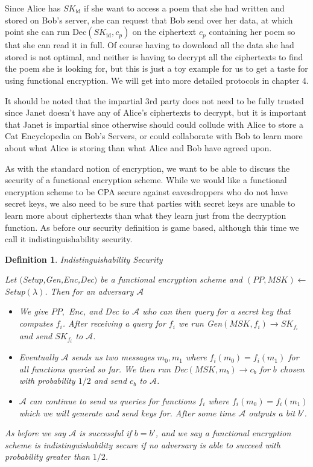 \documentclass[12pt,twoside]{reedthesis}
\newtheorem{definition}{Definition}
\begin{document}
\par Since Alice has $SK_\text{id}$ if she want to access a poem that she had written and stored on Bob's server, she can request that Bob send over her data, at which point she can run Dec$(SK_\text{id}, c_p)$ on the ciphertext $c_p$ containing her poem so that she can read it in full.  Of course having to download all the data she had stored is not optimal, and neither is having to decrypt all the ciphertexts to find the poem she is looking for, but this is just a toy example for us to get a taste for using functional encryption. We will get into more detailed protocols in chapter 4.


\par It should be noted that the impartial 3rd party does not need to be fully trusted since Janet doesn't have any of Alice's ciphertexts to decrypt, but it is important that Janet is impartial since otherwise should could collude with Alice to store a Cat Encyclopedia on Bob's Servers, or could collaborate with Bob to learn more about what Alice is storing than what Alice and Bob have agreed upon. 


\par As with the standard notion of encryption, we want to be able to discuss the security of a functional encryption scheme. While we would like a functional encryption scheme to be CPA secure against eavesdroppers who do not have secret keys, we also need to be sure that parties with secret keys are unable to learn more about ciphertexts than what they learn just from  the decryption function. As before our security definition is game based, although this time we call it indistinguishability security.\\

\begin{definition}{Indistinguishability Security}
\par Let $($Setup,Gen,Enc,Dec$)$ be a functional encryption scheme and $(PP,MSK)\leftarrow$Setup$(\lambda)$. Then for an adversary $\mathcal{A}$ 
\begin{itemize}
\item We give $PP,$ Enc, and Dec to $\mathcal{A}$ who can then query for a secret key that computes $f_i$. After receiving a query for $f_i$ we run Gen$(MSK,f_i) \to SK_{f_i}$ and send $SK_{f_i}$ to $\mathcal{A}$.
\item Eventually $\mathcal{A}$ sends us two messages $m_0,m_1$ where $f_i(m_0)=f_i(m_1)$ for all functions queried so far. We then run Dec$(MSK,m_b)\to c_b$ for $b$ chosen with probability $1/2$ and send $c_b$ to $\mathcal{A}$.
\item $\mathcal{A}$ can continue to send us queries for functions $f_i$ where $f_i(m_0) = f_i(m_1)$ which we will generate and send keys for. After some time $\mathcal{A}$ outputs a bit $b'$.
\end{itemize}
\par As before we say $\mathcal{A}$ is successful if $b = b'$, and we say a functional encryption scheme is indistinguishability secure if no adversary is able to succeed with probability greater than $1/2$.
\end{definition}
\end{document}
